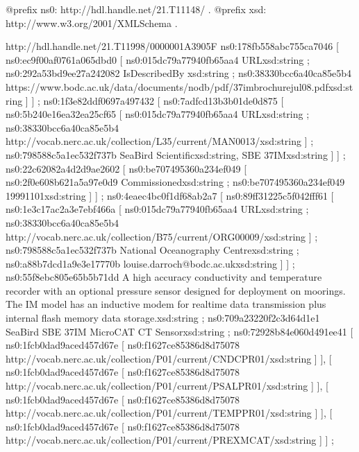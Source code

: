 \documentclass[a4paper,10pt,english]{sphinxmanual}
\begin{document}
\begin{sphinxVerbatim}[commandchars=\\\{\}]
  @prefix ns0: \PYGZlt{}http://hdl.handle.net/21.T11148/\PYGZgt{} .
  @prefix xsd: \PYGZlt{}http://www.w3.org/2001/XMLSchema\PYGZsh{}\PYGZgt{} .

  \PYGZlt{}http://hdl.handle.net/21.T11998/0000\PYGZhy{}001A\PYGZhy{}3905\PYGZhy{}F\PYGZgt{}
    ns0:178fb558abc755ca7046 [ ns0:ec9f00af0761a065dbd0 [
     ns0:015dc79a77940fb65aa4 \PYGZdq{}URL\PYGZdq{}\PYGZca{}\PYGZca{}xsd:string ;
     ns0:292a53bd9ee27a242082 \PYGZdq{}IsDescribedBy \PYGZdq{}\PYGZca{}\PYGZca{}xsd:string ;
     ns0:38330bcc6a40ca85e5b4 \PYGZdq{}https://www.bodc.ac.uk/data/documents/nodb/pdf/37imbrochurejul08.pdf\PYGZdq{}\PYGZca{}\PYGZca{}xsd:string
     ] ] ;
    ns0:1f3e82ddf0697a497432 [ ns0:7adfcd13b3b01de0d875 [
     ns0:5b240e16ea32ea25cf65 [
        ns0:015dc79a77940fb65aa4 \PYGZdq{}URL\PYGZdq{}\PYGZca{}\PYGZca{}xsd:string ;
        ns0:38330bcc6a40ca85e5b4 \PYGZdq{}http://vocab.nerc.ac.uk/collection/L35/current/MAN0013/\PYGZdq{}\PYGZca{}\PYGZca{}xsd:string
     ] ;
     ns0:798588c5a1ec532f737b \PYGZdq{}Sea\PYGZhy{}Bird Scientific\PYGZdq{}\PYGZca{}\PYGZca{}xsd:string, \PYGZdq{}SBE 37\PYGZhy{}IM\PYGZdq{}\PYGZca{}\PYGZca{}xsd:string
     ] ] ;
    ns0:22c62082a4d2d9ae2602 [ ns0:be707495360a234ef049 [
     ns0:2f0e608b621a5a97e0d9 \PYGZdq{}Commissioned\PYGZdq{}\PYGZca{}\PYGZca{}xsd:string ;
     ns0:be707495360a234ef049 \PYGZdq{}1999\PYGZhy{}11\PYGZhy{}01\PYGZdq{}\PYGZca{}\PYGZca{}xsd:string
     ] ] ;
    ns0:4eaec4bc0f1df68ab2a7 [ ns0:89ff31225c5f042fff61 [
     ns0:1e3c17ac2a3e7ebf466a [
        ns0:015dc79a77940fb65aa4 \PYGZdq{}URL\PYGZdq{}\PYGZca{}\PYGZca{}xsd:string ;
        ns0:38330bcc6a40ca85e5b4 \PYGZdq{}http://vocab.nerc.ac.uk/collection/B75/current/ORG00009/\PYGZdq{}\PYGZca{}\PYGZca{}xsd:string
     ] ;
     ns0:798588c5a1ec532f737b \PYGZdq{}National Oceanography Centre\PYGZdq{}\PYGZca{}\PYGZca{}xsd:string ;
     ns0:a88b7dcd1a9e3e17770b \PYGZdq{}louise.darroch@bodc.ac.uk\PYGZdq{}\PYGZca{}\PYGZca{}xsd:string
     ] ] ;
    ns0:55f8ebc805e65b5b71dd \PYGZdq{}A high accuracy conductivity and temperature recorder with an optional pressure sensor designed for deployment on moorings. The IM model has an inductive modem for real\PYGZhy{}time data transmission plus internal flash memory data storage.\PYGZdq{}\PYGZca{}\PYGZca{}xsd:string ;
    ns0:709a23220f2c3d64d1e1 \PYGZdq{}Sea\PYGZhy{}Bird SBE 37\PYGZhy{}IM MicroCAT C\PYGZhy{}T Sensor\PYGZdq{}\PYGZca{}\PYGZca{}xsd:string ;
    ns0:72928b84e060d491ee41 [ ns0:1fcb0dad9aced457d67e [ ns0:f1627ce85386d8d75078 \PYGZdq{}http://vocab.nerc.ac.uk/collection/P01/current/CNDCPR01/\PYGZdq{}\PYGZca{}\PYGZca{}xsd:string ] ], [ ns0:1fcb0dad9aced457d67e [ ns0:f1627ce85386d8d75078 \PYGZdq{}http://vocab.nerc.ac.uk/collection/P01/current/PSALPR01/\PYGZdq{}\PYGZca{}\PYGZca{}xsd:string ] ], [ ns0:1fcb0dad9aced457d67e [ ns0:f1627ce85386d8d75078 \PYGZdq{}http://vocab.nerc.ac.uk/collection/P01/current/TEMPPR01/\PYGZdq{}\PYGZca{}\PYGZca{}xsd:string ] ], [ ns0:1fcb0dad9aced457d67e [ ns0:f1627ce85386d8d75078 \PYGZdq{}http://vocab.nerc.ac.uk/collection/P01/current/PREXMCAT/\PYGZdq{}\PYGZca{}\PYGZca{}xsd:string ] ] ;

\end{sphinxVerbatim}
\end{document}
